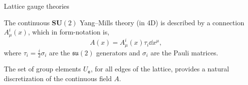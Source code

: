 \documentclass[12pt,titlepage]{article}
\begin{document}
\begin{frame}{Lattice gauge theories}
    \begin{list}{\,}{\leftmargin=1em \itemindent=0em}
        \item<1-> The continuous $\mathbf{SU}(2)$ Yang–Mills theory (in 4D) is described by a connection $A^i_\mu(x)$, which in form-notation is,
        \begin{equation}
            A(x)=A^i_\mu(x)\tau_i\dd{x^\mu},
        \end{equation}
        where $\tau_i=\frac{i}{2}\sigma_i$ are the $\mathfrak{su}(2)$ generators and $\sigma_i$ are the Pauli matrices.
        \item<2-> \noindent\FloatBarrier
        \begin{figure}[!ht]
            \begin{minipage}{0.39\linewidth}
            \end{minipage}
            \begin{minipage}{0.61\linewidth}
            \end{minipage}
        \end{figure}\FloatBarrier
        \item<5-> The set of group elements $U_\mathtt{e}$, for all edges of the lattice, provides a natural discretization of the continuous field $A$.
    \end{list}
\end{frame}
\end{document}
